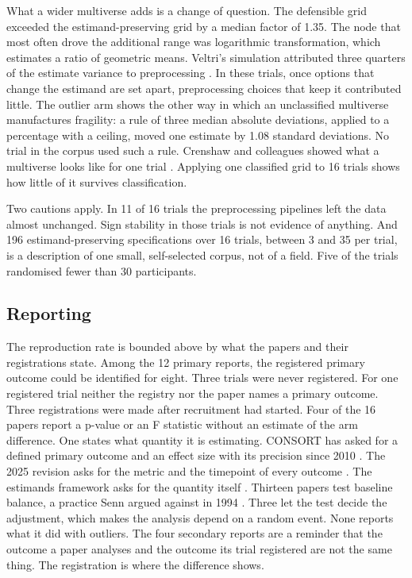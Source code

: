 What a wider multiverse adds is a change of question. The defensible grid exceeded the estimand-preserving grid by a median factor of 1.35. The node that most often drove the additional range was logarithmic transformation, which estimates a ratio of geometric means. Veltri's simulation attributed three quarters of the estimate variance to preprocessing \cite{Veltri_2025}. In these trials, once options that change the estimand are set apart, preprocessing choices that keep it contributed little. The outlier arm shows the other way in which an unclassified multiverse manufactures fragility: a rule of three median absolute deviations, applied to a percentage with a ceiling, moved one estimate by 1.08 standard deviations. No trial in the corpus used such a rule. Crenshaw and colleagues showed what a multiverse looks like for one trial \cite{Crenshaw_2026}. Applying one classified grid to 16 trials shows how little of it survives classification.

Two cautions apply. In 11 of 16 trials the preprocessing pipelines left the data almost unchanged. Sign stability in those trials is not evidence of anything. And 196 estimand-preserving specifications over 16 trials, between 3 and 35 per trial, is a description of one small, self-selected corpus, not of a field. Five of the trials randomised fewer than 30 participants.

\subsection{Reporting}\label{reporting}

The reproduction rate is bounded above by what the papers and their registrations state. Among the 12 primary reports, the registered primary outcome could be identified for eight. Three trials were never registered. For one registered trial neither the registry nor the paper names a primary outcome. Three registrations were made after recruitment had started. Four of the 16 papers report a p-value or an F statistic without an estimate of the arm difference. One states what quantity it is estimating. CONSORT has asked for a defined primary outcome and an effect size with its precision since 2010 \cite{Schulz_2010}. The 2025 revision asks for the metric and the timepoint of every outcome \cite{Hopewell_2025}. The estimands framework asks for the quantity itself \cite{ICH_2019_E9R1,Kahan_2024}. Thirteen papers test baseline balance, a practice Senn argued against in 1994 \cite{Senn_1994}. Three let the test decide the adjustment, which makes the analysis depend on a random event. None reports what it did with outliers. The four secondary reports are a reminder that the outcome a paper analyses and the outcome its trial registered are not the same thing. The registration is where the difference shows.

